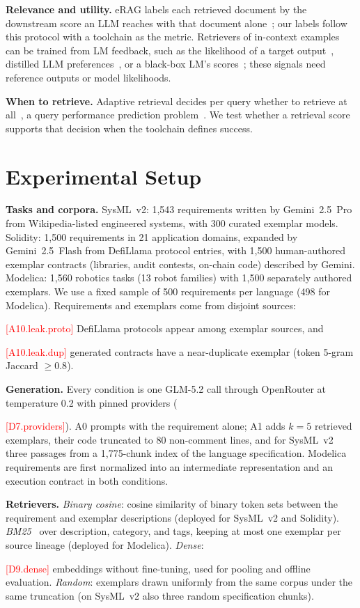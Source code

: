 \documentclass[runningheads]{llncs}
\newcommand{\tbd}[1]{\ifbool{submission}%
  {\PackageError{forge}{Unfilled placeholder #1}{See the runbook placeholder table.}}%
  {\mbox{\textcolor{red}{\textsf{\tiny[#1]}}}}}
\begin{document}
\textbf{Relevance and utility.} eRAG labels each retrieved document by the downstream score an LLM reaches with that document alone~\cite{salemi2024erag}; our labels follow this protocol with a toolchain as the metric. Retrievers of in-context examples can be trained from LM feedback, such as the likelihood of a target output~\cite{rubin2022epr}, distilled LLM preferences~\cite{wang2024llmr}, or a black-box LM's scores~\cite{shi2024replug}; these signals need reference outputs or model likelihoods.

\textbf{When to retrieve.} Adaptive retrieval decides per query whether to retrieve at all~\cite{mallen2023adaptive,asai2024selfrag,jiang2023flare}, a query performance prediction problem~\cite{cronen2002qpp}. We test whether a retrieval score supports that decision when the toolchain defines success.

\section{Experimental Setup}
\label{sec:setup}

\textbf{Tasks and corpora.} SysML~v2: 1{,}543 requirements written by Gemini~2.5~Pro from Wikipedia-listed engineered systems, with 300 curated exemplar models. Solidity: 1{,}500 requirements in 21 application domains, expanded by Gemini~2.5~Flash from DefiLlama protocol entries, with 1{,}500 human-authored exemplar contracts (libraries, audit contests, on-chain code) described by Gemini. Modelica: 1{,}560 robotics tasks (13 robot families) with 1{,}500 separately authored exemplars. We use a fixed sample of 500 requirements per language (498 for Modelica). Requirements and exemplars come from disjoint sources: \tbd{A10.leak.proto} DefiLlama protocols appear among exemplar sources, and \tbd{A10.leak.dup} generated contracts have a near-duplicate exemplar (token 5-gram Jaccard $\geq 0.8$).

\textbf{Generation.} Every condition is one GLM-5.2 call through OpenRouter at temperature 0.2 with pinned providers (\tbd{D7.providers}). A0 prompts with the requirement alone; A1 adds $k=5$ retrieved exemplars, their code truncated to 80 non-comment lines, and for SysML~v2 three passages from a 1{,}775-chunk index of the language specification. Modelica requirements are first normalized into an intermediate representation and an execution contract in both conditions.

\textbf{Retrievers.} \emph{Binary cosine}: cosine similarity of binary token sets between the requirement and exemplar descriptions (deployed for SysML~v2 and Solidity). \emph{BM25}~\cite{robertson2009bm25} over description, category, and tags, keeping at most one exemplar per source lineage (deployed for Modelica). \emph{Dense}: \tbd{D9.dense} embeddings without fine-tuning, used for pooling and offline evaluation. \emph{Random}: exemplars drawn uniformly from the same corpus under the same truncation (on SysML~v2 also three random specification chunks).
\end{document}
